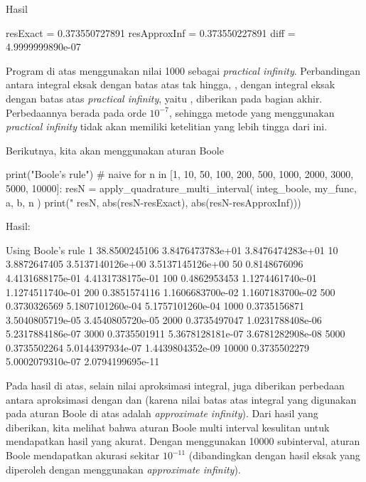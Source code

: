 Hasil
\begin{textcode}
resExact     =     0.373550727891
resApproxInf =     0.373550227891
diff         =   4.9999999890e-07    
\end{textcode}

Program di atas menggunakan nilai 1000 sebagai \textit{practical infinity}.
Perbandingan antara integral eksak dengan batas atas tak hingga, ,
dengan integral eksak dengan batas atas \textit{practical infinity},
yaitu , diberikan pada
bagian akhir. Perbedaannya berada pada orde $10^{-7}$, sehingga metode
yang menggunakan \textit{practical infinity} tidak akan memiliki ketelitian
yang lebih tingga dari ini.

Berikutnya, kita akan menggunakan aturan Boole
\begin{pythoncode}
print("\nUsing Boole's rule") # naive
for n in [1, 10, 50, 100, 200, 500, 1000, 2000, 3000, 5000, 10000]:
    resN = apply_quadrature_multi_interval(
        integ_boole, my_func, a, b, n
    )    
    print("%
        resN, abs(resN-resExact), abs(resN-resApproxInf)))
\end{pythoncode}

Hasil:
\begin{textcode}
Using Boole's rule
    1      38.8500245106   3.8476473783e+01   3.8476474283e+01
   10       3.8872647405   3.5137140126e+00   3.5137145126e+00
   50       0.8148676096   4.4131688175e-01   4.4131738175e-01
  100       0.4862953453   1.1274461740e-01   1.1274511740e-01
  200       0.3851574116   1.1606683700e-02   1.1607183700e-02
  500       0.3730326569   5.1807101260e-04   5.1757101260e-04
 1000       0.3735156871   3.5040805719e-05   3.4540805720e-05
 2000       0.3735497047   1.0231788408e-06   5.2317884186e-07
 3000       0.3735501911   5.3678128181e-07   3.6781282908e-08
 5000       0.3735502264   5.0144397934e-07   1.4439804352e-09
10000       0.3735502279   5.0002079310e-07   2.0794199695e-11
\end{textcode}
Pada hasil di atas, selain nilai aproksimasi integral, juga diberikan
perbedaan antara aproksimasi dengan  dan
 (karena nilai batas atas integral yang digunakan
pada aturan Boole di atas
adalah \textit{approximate infinity}).
Dari hasil yang diberikan, kita melihat bahwa aturan Boole multi interval
kesulitan untuk mendapatkan hasil yang akurat. Dengan menggunakan 10000 subinterval,
aturan Boole mendapatkan akurasi sekitar $10^{-11}$ (dibandingkan dengan hasil eksak
yang diperoleh dengan menggunakan \textit{approximate infinity}).

